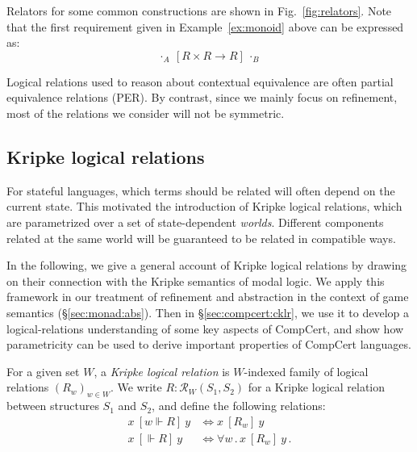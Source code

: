 \documentclass[acmsmall,timestamp,review,anonymous]{acmart}
\newcommand{\ifr}[1]{\ [{#1}]\ }
\begin{document}
Relators for some common constructions are shown in Fig.~\ref{fig:relators}.
Note that the first requirement given in Example~\ref{ex:monoid} above
can be expressed as:
\[
  \cdot_A \ifr{R \times R \rightarrow R} \cdot_B
\]

Logical relations used to reason about contextual equivalence
are often partial equivalence relations (PER).
By contrast, since we mainly focus on refinement,
most of the relations we consider will not be symmetric.


\subsection{Kripke logical relations} %
\label{sec:klr}

For stateful languages,
which terms should be related
will often depend on the current state.
This motivated the introduction of Kripke logical relations,
which are parametrized over a set of state-dependent \emph{worlds}.
Different components related at the same world
will be guaranteed to be related in compatible ways.

In the following,
we give a general account of Kripke logical relations
by drawing on their connection with
the Kripke semantics of modal logic.
We apply this framework
in our treatment of refinement and abstraction
in the context of game semantics (\S\ref{sec:monad:abs}).
Then in \S\ref{sec:compcert:cklr},
we use it to develop a logical-relations
understanding of some key aspects of CompCert,
and show how parametricity
can be used to derive important properties
of CompCert languages.

\begin{definition}
For a given set $W$,
a \emph{Kripke logical relation} is
$W$-indexed family of logical relations $(R_w)_{w \in W}$.
We write $R : \mathcal{R}_W(S_1, S_2)$
for a Kripke logical relation between structures $S_1$ and $S_2$,
and define the following relations:
\begin{align*}
  x \ifr{w \Vdash R} y &\Leftrightarrow x \ifr{R_w} y \\
  x \ifr{\Vdash R} y &\Leftrightarrow \forall w \,.\, x \ifr{R_w} y \,.
\end{align*}
\end{definition}
\end{document}
